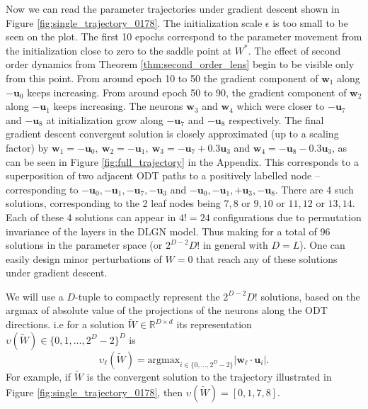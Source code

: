 \documentclass{article}
\theoremstyle{plain}
\theoremstyle{definition}
\theoremstyle{remark}
\newcommand{\R}{{\mathbb R}}
\newcommand{\1}{{\mathbf 1}}
\newcommand{\0}{{\mathbf 0}}
\newcommand{\w}{{\mathbf w}}
\newcommand{\bu}{{\mathbf u}}
\renewcommand{\>}{{\rightarrow}}
\begin{document}
Now we can read the parameter trajectories under gradient descent shown in Figure \ref{fig:single_trajectory_0178}. The initialization scale $\epsilon$ is too small to be seen on the plot. The first 10 epochs correspond to the parameter movement from the initialization close to zero to the saddle point at $W^*$. The effect of second order dynamics from Theorem \ref{thm:second_order_lens} begin to be visible only from this point. From around epoch 10 to 50  the gradient component of $\w_1$ along $-\bu_0$ keeps increasing. From around epoch 50 to 90, the gradient component of $\w_2$ along $-\bu_1$ keeps increasing. The neurons $\w_3$ and $\w_4$ which were closer to $-\bu_7$ and $-\bu_8$ at initialization grow along $-\bu_7$ and $-\bu_8$ respectively. The final gradient descent convergent solution is closely approximated (up to a scaling factor) by $\w_1 = -\bu_0, ~ \w_2 = -\bu_1,~ \w_3 = -\bu_7+0.3\bu_3$ and $ \w_4 = -\bu_8-0.3 \bu_3$, as can be seen in Figure \ref{fig:full_trajectory} in the Appendix. This corresponds  to a superposition of two adjacent ODT paths to a positively labelled node -- corresponding to $-\bu_0, -\bu_1, -\bu_7, -\bu_3$ and $-\bu_0, -\bu_1, +\bu_3, -\bu_8$. There are 4 such solutions, corresponding to the 2 leaf nodes being $7,8$ or $9,10$ or $11,12$ or $13,14$. Each of these 4 solutions can appear in $4!=24$ configurations due to permutation invariance of the layers in the DLGN model. Thus making for a total of 96 solutions in the parameter space (or $2^{D-2}D!$ in general with $D=L$). One can easily design minor perturbations of $W=0$ that reach any of these solutions under gradient descent. 

We will use a $D$-tuple to compactly represent the $2^{D-2}D!$ solutions, based on the argmax of absolute value of the projections of the neurons along the ODT directions. i.e for a solution $\tilde W \in \R^{D \times d}$ its representation $\upsilon(\tilde W) \in \{0,1,\ldots,2^{D}-2\}^D$ is 
\[
\upsilon_\ell(\tilde W) = \text{argmax}_{i \in \{0,\ldots,2^D-2\}} |\w_\ell \cdot \bu_i|.
\]
For example, if $\tilde W$ is the convergent solution to the trajectory illustrated in Figure \ref{fig:single_trajectory_0178}, then $\upsilon(\tilde W) = [0,1,7,8]$.
 

\end{document}
